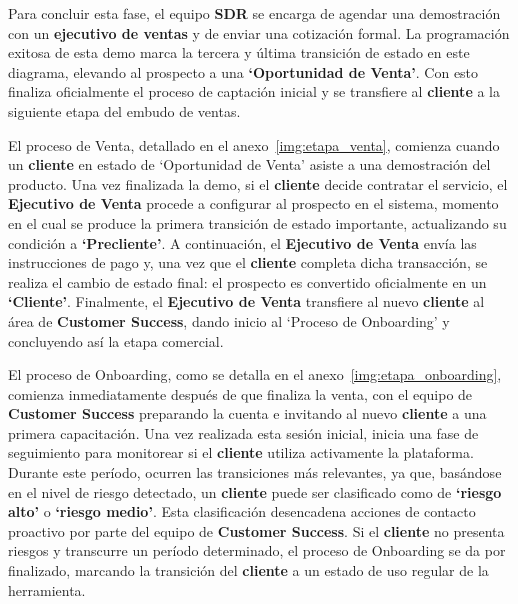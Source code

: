Para concluir esta fase, el equipo \textbf{SDR} se encarga de agendar una demostración con un \textbf{ejecutivo de ventas} y de enviar una cotización formal. La programación exitosa de esta demo marca la tercera y última transición de estado en este diagrama, elevando al prospecto a una \textbf{`Oportunidad de Venta'}. Con esto finaliza oficialmente el proceso de captación inicial y se transfiere al \textbf{cliente} a la siguiente etapa del embudo de ventas.

El proceso de Venta, detallado en el anexo~\ref{img:etapa_venta}, comienza cuando un \textbf{cliente} en estado de `Oportunidad de Venta' asiste a una demostración del producto. Una vez finalizada la demo, si el \textbf{cliente} decide contratar el servicio, el \textbf{Ejecutivo de Venta} procede a configurar al prospecto en el sistema, momento en el cual se produce la primera transición de estado importante, actualizando su condición a \textbf{`Precliente'}. A continuación, el \textbf{Ejecutivo de Venta} envía las instrucciones de pago y, una vez que el \textbf{cliente} completa dicha transacción, se realiza el cambio de estado final: el prospecto es convertido oficialmente en un \textbf{`Cliente'}. Finalmente, el \textbf{Ejecutivo de Venta} transfiere al nuevo \textbf{cliente} al área de \textbf{Customer Success}, dando inicio al `Proceso de Onboarding' y concluyendo así la etapa comercial.

El proceso de Onboarding, como se detalla en el anexo~\ref{img:etapa_onboarding}, comienza inmediatamente después de que finaliza la venta, con el equipo de \textbf{Customer Success} preparando la cuenta e invitando al nuevo \textbf{cliente} a una primera capacitación. Una vez realizada esta sesión inicial, inicia una fase de seguimiento para monitorear si el \textbf{cliente} utiliza activamente la plataforma. Durante este período, ocurren las transiciones más relevantes, ya que, basándose en el nivel de riesgo detectado, un \textbf{cliente} puede ser clasificado como de \textbf{`riesgo alto'} o \textbf{`riesgo medio'}. Esta clasificación desencadena acciones de contacto proactivo por parte del equipo de \textbf{Customer Success}. Si el \textbf{cliente} no presenta riesgos y transcurre un período determinado, el proceso de Onboarding se da por finalizado, marcando la transición del \textbf{cliente} a un estado de uso regular de la herramienta.

